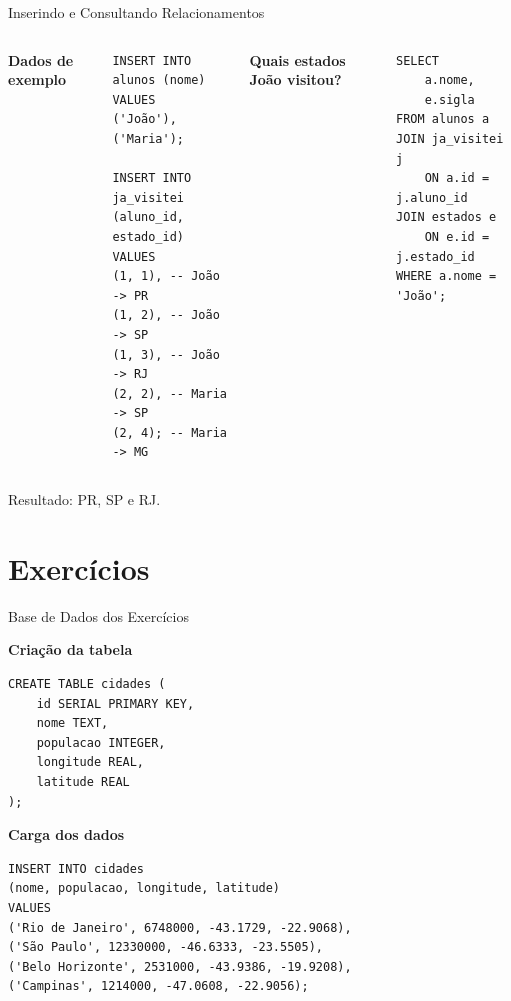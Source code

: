 \documentclass{beamer}
\begin{document}
\begin{frame}[fragile]{Inserindo e Consultando Relacionamentos}

\begin{columns}
\textbf{Dados de exemplo}

\begin{verbatim}
INSERT INTO alunos (nome)
VALUES
('João'),
('Maria');

INSERT INTO ja_visitei
(aluno_id, estado_id)
VALUES
(1, 1), -- João -> PR
(1, 2), -- João -> SP
(1, 3), -- João -> RJ
(2, 2), -- Maria -> SP
(2, 4); -- Maria -> MG
\end{verbatim}

\vspace{0.2cm}

\textbf{Quais estados João visitou?}

\begin{verbatim}
SELECT
    a.nome,
    e.sigla
FROM alunos a
JOIN ja_visitei j
    ON a.id = j.aluno_id
JOIN estados e
    ON e.id = j.estado_id
WHERE a.nome = 'João';
\end{verbatim}
\end{columns}
\vspace{0.2cm}

Resultado: PR, SP e RJ.

\end{frame}

\section{Exercícios}

\begin{frame}[fragile]{Base de Dados dos Exercícios}

\textbf{Criação da tabela}

\begin{verbatim}
CREATE TABLE cidades (
    id SERIAL PRIMARY KEY,
    nome TEXT,
    populacao INTEGER,
    longitude REAL,
    latitude REAL
);
\end{verbatim}

\textbf{Carga dos dados}

\begin{verbatim}
INSERT INTO cidades
(nome, populacao, longitude, latitude)
VALUES
('Rio de Janeiro', 6748000, -43.1729, -22.9068),
('São Paulo', 12330000, -46.6333, -23.5505),
('Belo Horizonte', 2531000, -43.9386, -19.9208),
('Campinas', 1214000, -47.0608, -22.9056);
\end{verbatim}

\end{frame}
\end{document}
